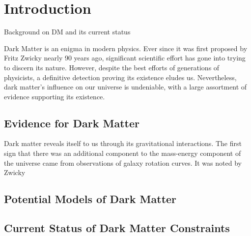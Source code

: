 \graphicspath{{img/chapter_1/}}

\chapter{Introduction}
\label{chapter:introduction}

\begin{synopsis}
Background on DM and its current status
\end{synopsis}

Dark Matter is an enigma in modern physics. Ever since it was first 
proposed by Fritz Zwicky nearly 90 years ago, significant scientific
effort has gone into trying to discern its nature. However, despite the
best efforts of generations of physicists, a definitive detection
proving its existence eludes us. Nevertheless, dark matter's influence 
on our universe is undeniable, with a large assortment of evidence 
supporting its existence. 


\section{Evidence for Dark Matter}

Dark matter reveals itself to us through its gravitational interactions. The first sign that there was an additional component to the mass-energy component of the universe came from observations of galaxy rotation curves. It was noted by Zwicky~

\section{Potential Models of Dark Matter}


\section{Current Status of Dark Matter Constraints}

